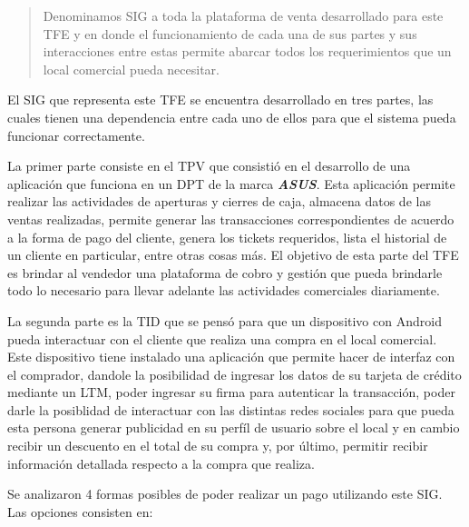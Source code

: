 \begin{quote}
Denominamos \ac{SIG} a toda la plataforma de venta desarrollado para este \ac{TFE} y en donde el funcionamiento de cada una de sus partes y sus interacciones entre estas permite abarcar todos los requerimientos que un local comercial pueda necesitar.
\end{quote}

El \ac{SIG} que representa este \ac{TFE} se encuentra desarrollado en tres partes, las cuales tienen una dependencia entre cada uno de ellos para que el sistema pueda funcionar correctamente.

La primer parte consiste en el \ac{TPV} que consisti\'o en el desarrollo de una aplicaci\'on que funciona en un \ac{DPT} de la marca \textbf{\textit{ASUS}}. Esta aplicaci\'on permite realizar las actividades de aperturas y cierres de caja, almacena datos de las ventas realizadas, permite generar las transacciones correspondientes de acuerdo a la forma de pago del cliente, genera los tickets requeridos, lista el historial de un cliente en particular, entre otras cosas m\'as. El objetivo de esta parte del \ac{TFE} es brindar al vendedor una plataforma de cobro y gesti\'on que pueda brindarle todo lo necesario para llevar adelante las actividades comerciales diariamente.

La segunda parte es la \ac{TID} que se pens\'o para que un dispositivo con Android\Si{\texttrademark} pueda interactuar con el cliente que realiza una compra en el local comercial. Este dispositivo tiene instalado una aplicaci\'on que permite hacer de interfaz con el comprador, dandole la posibilidad de ingresar los datos de su tarjeta de cr\'edito mediante un \ac{LTM}, poder ingresar su firma para autenticar la transacci\'on, poder darle la posiblidad de interactuar con las distintas redes sociales para que pueda esta persona generar publicidad en su perf\'il de usuario sobre el local y en cambio recibir un descuento en el total de su compra y, por \'ultimo, permitir recibir informaci\'on detallada respecto a la compra que realiza.

Se analizaron 4 formas posibles de poder realizar un pago utilizando este \ac{SIG}. Las opciones consisten en:

